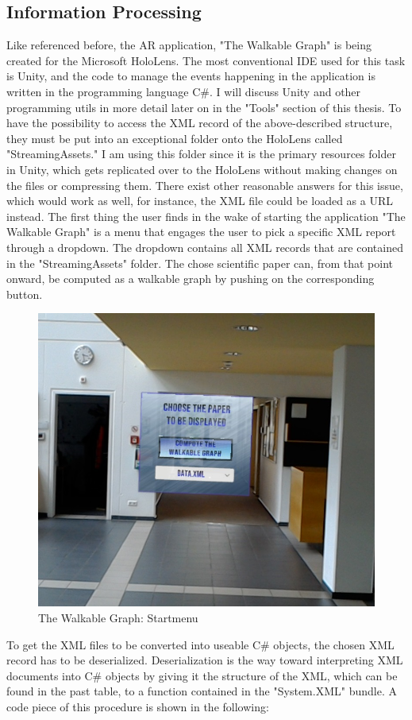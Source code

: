\documentclass[12pt,a4paper,oneside,american,parskip=half]{article}
\begin{document}
\begin{justify}
\begin{normalsize}
\subsection{Information Processing}
Like referenced before, the AR application, "The Walkable Graph" is being created for the Microsoft HoloLens. The most conventional \ac{IDE} used for this task is Unity, and the code to manage the events happening in the application is written in the programming language C\#. I will discuss Unity and other programming utils in more detail later on in the "Tools" section of this thesis.
\newline
To have the possibility to access the XML record of the above-described structure, they must be put into an exceptional folder onto the HoloLens called "StreamingAssets."  I am using this folder since it is the primary resources folder in Unity, which gets replicated over to the HoloLens without making changes on the files or compressing them.
There exist other reasonable answers for this issue, which would work as well, for instance, the XML file could be loaded as a URL instead.
The first thing the user finds in the wake of starting the application "The Walkable Graph" is a menu that engages the user to pick a specific XML report through a dropdown. The dropdown contains all XML records that are contained in the "StreamingAssets" folder. The chose scientific paper can, from that point onward, be computed as a walkable graph by pushing on the corresponding button.
\clearpage
\begin{figure}[h!]
\centering
\includegraphics[width = 10 cm]{menu2.jpg}
\caption{The Walkable Graph: Startmenu}
\end{figure} \par
To get the XML files to be converted into useable C\# objects, the chosen XML record has to be deserialized. Deserialization is the way toward interpreting XML documents into C\# objects by giving it the structure of the XML, which can be found in the past table, to a function contained in the "System.XML" bundle. A code piece of this procedure is shown in the following:


\end{normalsize}
\end{justify}
\end{document}
